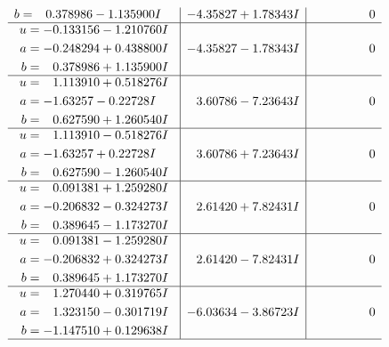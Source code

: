 \documentclass[1p]{elsarticle_modified}
\theoremstyle{definition}
\begin{document}
$$\begin{array}{c|c|c}
\begin{aligned}
b &= \phantom{-}0.378986 - 1.135900 I\end{aligned}
 & -4.35827 + 1.78343 I & \phantom{-0.000000 } 0 \\ \hline\begin{aligned}
u &= -0.133156 - 1.210760 I \\
a &= -0.248294 + 0.438800 I \\
b &= \phantom{-}0.378986 + 1.135900 I\end{aligned}
 & -4.35827 - 1.78343 I & \phantom{-0.000000 } 0 \\ \hline\begin{aligned}
u &= \phantom{-}1.113910 + 0.518276 I \\
a &= -1.63257 - 0.22728 I \\
b &= \phantom{-}0.627590 + 1.260540 I\end{aligned}
 & \phantom{-}3.60786 - 7.23643 I & \phantom{-0.000000 } 0 \\ \hline\begin{aligned}
u &= \phantom{-}1.113910 - 0.518276 I \\
a &= -1.63257 + 0.22728 I \\
b &= \phantom{-}0.627590 - 1.260540 I\end{aligned}
 & \phantom{-}3.60786 + 7.23643 I & \phantom{-0.000000 } 0 \\ \hline\begin{aligned}
u &= \phantom{-}0.091381 + 1.259280 I \\
a &= -0.206832 - 0.324273 I \\
b &= \phantom{-}0.389645 - 1.173270 I\end{aligned}
 & \phantom{-}2.61420 + 7.82431 I & \phantom{-0.000000 } 0 \\ \hline\begin{aligned}
u &= \phantom{-}0.091381 - 1.259280 I \\
a &= -0.206832 + 0.324273 I \\
b &= \phantom{-}0.389645 + 1.173270 I\end{aligned}
 & \phantom{-}2.61420 - 7.82431 I & \phantom{-0.000000 } 0 \\ \hline\begin{aligned}
u &= \phantom{-}1.270440 + 0.319765 I \\
a &= \phantom{-}1.323150 - 0.301719 I \\
b &= -1.147510 + 0.129638 I\end{aligned}
 & -6.03634 - 3.86723 I & \phantom{-0.000000 } 0\\
 \hline 
 \end{array}$$\newpage$$\begin{array}{c|c|c}  

\end{array}$$
\end{document}
